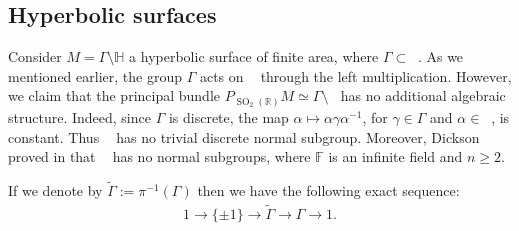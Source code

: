 \documentclass[12pt]{amsart}
\theoremstyle{definition}
\def\RR{{\mathbb R}}
\def\HH{{\mathbb{H}}}
\def\g{{\gamma}}
\def\G{{\Gamma}}
\DeclareMathOperator{\psl}{PSL_2(\mathbb{R})}
\DeclareMathOperator{\pslf}{PSL_n(\mathbb{F})}
\newcommand{\so}{\operatorname{SO}}
\begin{document}
\subsection{Hyperbolic surfaces}
Consider $M = \G \setminus \HH$ a hyperbolic surface of finite area, where $\G \subset \psl$. As we mentioned earlier, the group $\G$ acts on $\psl$ through the left multiplication. However, we claim that the principal bundle $P_{\so_2(\RR)}M \simeq \G \setminus \psl$ has no additional algebraic structure. Indeed, since $\G$ is discrete, the map $\alpha \mapsto \alpha\g \alpha^{-1}$, for $\g \in \G$ and $\alpha\in \psl$, is constant. Thus $\psl$ has no trivial discrete normal subgroup. Moreover, Dickson proved in \cite{dickson} that $\pslf$ has no normal subgroups, where $\mathbb{F}$ is an infinite field and $n\geq2$. 

If we denote by $\tilde{\G}:= \pi^{-1}(\G)$ then we have the following exact sequence:
\begin{align}\label{exactSequence}
 1 \longrightarrow \{ \pm 1 \} \longrightarrow \tilde{\G} \longrightarrow \G \longrightarrow 1.
\end{align}
\end{document}

